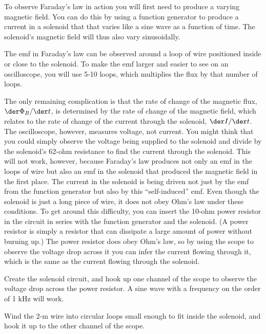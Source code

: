 \observations


To observe Faraday's law in action you will first need to
produce a varying magnetic field. You can do this by using a
function generator to produce a current in a solenoid that
that varies like a sine wave as a function of time. The
solenoid's magnetic field will thus also vary sinusoidally.

The emf  in Faraday's law can be observed around a loop of
wire positioned inside or close to the solenoid. To make the
emf larger and easier to see on an oscilloscope, you will
use 5-10 loops, which multiplies the flux by that number of
loops.

The only remaining complication is that the rate of change
of the magnetic flux, $\der \Phi_B/\der t$,
is determined by the rate of change
of the magnetic field, which relates to the rate of change
of the current through the solenoid, $\der I/\der t$. The oscilloscope,
however, measures voltage, not current. You might think that
you could simply observe the voltage being supplied to the
solenoid and divide by the solenoid's 62-ohm resistance to
find the current through the solenoid. This will not work,
however, because Faraday's law produces not only an emf in
the loops of wire but also an emf in the solenoid that
produced the magnetic field in the first place. The current
in the solenoid is being driven not just by the emf from the
function generator but also by this ``self-induced'' emf.
Even though the solenoid is just a long piece of wire, it
does not obey Ohm's law under these conditions. To get
around this difficulty, you can insert the 10-ohm
power resistor in the circuit in series with the function
generator and the solenoid. (A power resistor is simply a
resistor that can dissipate a large amount of power without
burning up.) The power resistor does obey Ohm's law, so by
using the scope to observe the voltage drop across it you
can infer the current flowing through it, which is the same
as the current flowing through the solenoid.

Create the solenoid circuit, and hook up one channel of the
scope to observe the voltage drop across the power resistor.
A sine wave with a frequency on the order of 1 kHz will work.

Wind the 2-m wire into circular loops small enough to fit
inside the solenoid, and hook it up to the other channel of the scope.


